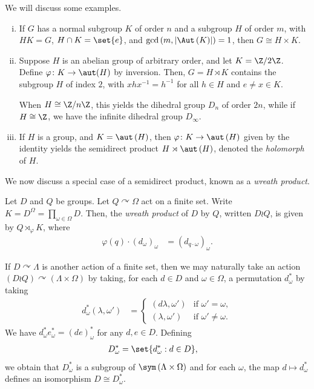 \documentclass[10pt]{mypackage}
\begin{document}
We will discuss some examples.
\begin{enumerate}[(i)]
  \item If $G$ has a normal subgroup $K$ of order $n$ and a subgroup $H$ of order $m$, with $HK = G$, $H\cap K = \set{e}$, and $\gcd\left( m,\left\vert \Aut\left( K \right) \right\vert \right) = 1$, then $G\cong H\times K$.
  \item Suppose $H$ is an abelian group of arbitrary order, and let $K = \Z/2\Z$. Define $\varphi\colon K\rightarrow \aut(H)$ by inversion. Then, $G = H\rtimes K$ contains the subgroup $H$ of index $2$, with $xhx^{-1} = h^{-1}$ for all $h\in H$ and $e\neq x\in K$.
    
    When $H\cong \Z/n\Z$, this yields the dihedral group $D_n$ of order $2n$, while if $H \cong \Z$, we have the infinite dihedral group $D_{\infty}$.
  \item If $H$ is a group, and $K = \aut\left( H \right)$, then $\varphi\colon K\rightarrow \aut\left( H \right)$ given by the identity yields the semidirect product $H\rtimes \aut\left( H \right)$, denoted the \textit{holomorph} of $H$.
\end{enumerate}
We now discuss a special case of a semidirect product, known as a \textit{wreath product}.
\begin{definition}
  Let $D$ and $Q$ be groups. Let $Q\curvearrowright\Omega$ act on a finite set. Write $K = D^{\Omega} = \prod_{\omega\in\Omega}D$. Then, the \textit{wreath product} of $D$ by $Q$, written $D\wr Q$, is given by $Q\rtimes_{\varphi}K$, where
  \begin{align*}
    \varphi(q)\cdot \left( d_{\omega} \right)_{\omega} &= \left( d_{q\cdot \omega} \right)_{\omega}.
  \end{align*}
\end{definition}
If $D\curvearrowright \Lambda$ is another action of a finite set, then we may naturally take an action $\left( D\wr Q \right)\curvearrowright \left( \Lambda\times\Omega \right)$ by taking, for each $d\in D$ and $\omega\in \Omega$, a permutation $d_{\omega}^{\ast}$ by taking
\begin{align*}
  d_{\omega}^{\ast}\left( \lambda,\omega' \right) &= \begin{cases}
    \left( d\lambda,\omega' \right) & \text{if }\omega' = \omega,\\
    \left( \lambda,\omega' \right) & \text{if }\omega'\neq \omega.
  \end{cases}
\end{align*}
We have $d_{\omega}^{\ast}e_{\omega}^{\ast} = \left( de \right)_{\omega}^{\ast}$ for any $d,e\in D$. Defining
\begin{align*}
  D_{\omega}^{\ast} &= \set{d_{\omega}^{\ast} : d\in D},
\end{align*}
we obtain that $D_{\omega}^{\ast}$ is a subgroup of $\sym\left( \Lambda\times\Omega \right)$ and for each $\omega$, the map $d\mapsto d_{\omega}^{\ast}$ defines an isomorphism $D\cong D_{\omega}^{\ast}$.
\end{document}
